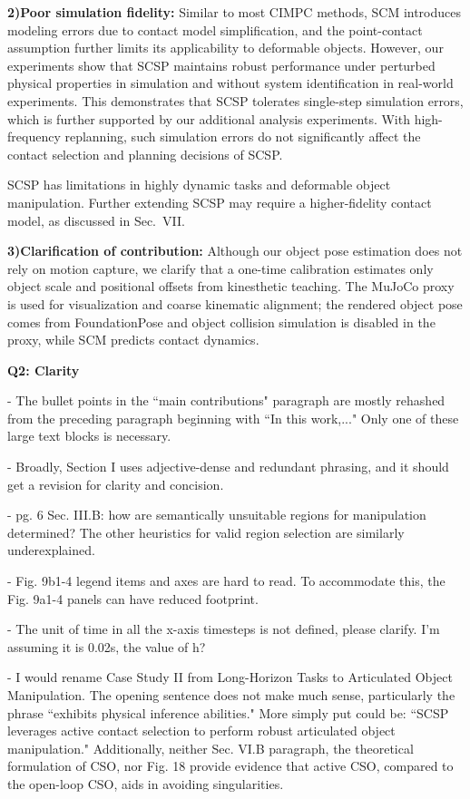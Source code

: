 \documentclass[journal,10pt]{IEEEtran}
\newcommand{\question}[2]{\par\smallskip\noindent
 \color{responseblue}\textbf{Q#1: #2}\par\nobreak\noindent\color{responseblue}}
\begin{document}
\textbf{2)Poor simulation fidelity:} Similar to most CIMPC methods, SCM introduces modeling errors due to contact model simplification, and the point-contact assumption further limits its applicability to deformable objects. However, our experiments show that SCSP maintains robust performance under perturbed physical properties in simulation and without system identification in real-world
experiments. This demonstrates that SCSP tolerates single-step simulation errors, which is further supported by our additional analysis experiments. With high-frequency replanning, such simulation errors do not significantly
affect the contact selection and planning decisions of SCSP.

SCSP has limitations in highly dynamic tasks and deformable object manipulation. Further extending SCSP may require a higher-fidelity contact model, as discussed in Sec.~VII.

\textbf{3)Clarification of contribution:}
Although our object pose estimation does not rely on motion capture, we clarify that a one-time calibration estimates only object scale and positional offsets from kinesthetic teaching. The MuJoCo proxy is used for visualization and coarse kinematic alignment; the rendered object pose comes from FoundationPose and object collision simulation is disabled in the proxy, while SCM predicts contact dynamics.
\question{2}{Clarity}

- The bullet points in the ``main contributions" paragraph are mostly
rehashed from the preceding paragraph beginning with ``In this work,..."
Only one of these large text blocks is necessary.

- Broadly, Section I uses adjective-dense and redundant phrasing, and
it should get a revision for clarity and concision.

- pg. 6 Sec. III.B: how are semantically unsuitable regions for
manipulation determined? The other heuristics for valid region
selection are similarly underexplained.

- Fig. 9b1-4 legend items and axes are hard to read. To accommodate
this, the Fig. 9a1-4 panels can have reduced footprint.

- The unit of time in all the x-axis timesteps is not defined, please
clarify. I'm assuming it is 0.02s, the value of h?

- I would rename Case Study II from Long-Horizon Tasks to Articulated
Object Manipulation. The opening sentence does not make much sense,
particularly the phrase ``exhibits physical inference abilities." More
simply put could be: ``SCSP leverages active contact selection to
perform robust articulated object manipulation." Additionally, neither
Sec. VI.B paragraph, the theoretical formulation of CSO, nor Fig. 18
provide evidence that active CSO, compared to the open-loop CSO, aids
in avoiding singularities.
\end{document}
